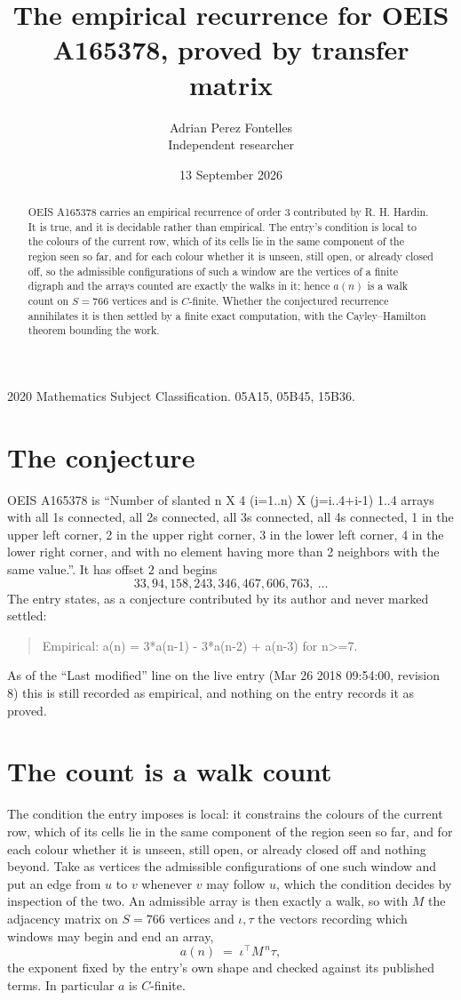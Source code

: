 \documentclass[11pt,a4paper]{article}
\title{The empirical recurrence for OEIS A165378, proved by transfer matrix}
\author{Adrian Perez Fontelles\\ \small Independent researcher}
\date{13 September 2026}
\theoremstyle{plain}
\theoremstyle{definition}
\begin{document}
\maketitle

\begin{abstract}
OEIS A165378 carries an empirical recurrence of order $3$ contributed by R. H. Hardin. It is
true, and it is decidable rather than empirical. The entry's condition is local to the colours of the current row, which of its cells lie in the same component of the region seen so far, and for each colour whether it is unseen, still open, or already closed off, so
the admissible configurations of such a window are the vertices of a finite digraph and the
arrays counted are exactly the walks in it; hence $a(n)$ is a walk count on $S=766$ vertices
and is $C$-finite. Whether the conjectured recurrence annihilates it is then settled by a
finite exact computation, with the Cayley--Hamilton theorem bounding the work.
\end{abstract}

\noindent\small 2020 Mathematics Subject Classification. 05A15, 05B45, 15B36.\normalsize

\section{The conjecture}

OEIS A165378 is ``Number of slanted n X 4 (i=1..n) X (j=i..4+i-1) 1..4 arrays with all 1s connected, all 2s connected, all 3s connected, all 4s connected, 1 in the upper left corner, 2 in the upper right corner, 3 in the lower left corner, 4 in the lower right corner, and with no element having more than 2 neighbors with the same value.''. It has offset $2$ and begins
\[
33, 94, 158, 243, 346, 467, 606, 763,\ \dots
\]
The entry states, as a conjecture contributed by its author and never marked settled:
\begin{quote}
Empirical: a(n) = 3*a(n-1) - 3*a(n-2) + a(n-3) for n>=7.
\end{quote}
As of the ``Last modified'' line on the live entry (Mar 26 2018 09:54:00, revision 8) this is still
recorded as empirical, and nothing on the entry records it as proved.

\section{The count is a walk count}

The condition the entry imposes is local: it constrains the colours of the current row, which of its cells lie in the same component of the region seen so far, and for each colour whether it is unseen, still open, or already closed off and nothing beyond. Take as
vertices the admissible configurations of one such window and put an edge from $u$ to $v$
whenever $v$ may follow $u$, which the condition decides by inspection of the two. An
admissible array is then exactly a walk, so with $M$ the adjacency matrix on $S=766$ vertices
and $\iota,\tau$ the vectors recording which windows may begin and end an array,
\[
a(n)\;=\;\iota^{\!\top}M^{\,n}\tau ,
\]
the exponent fixed by the entry's own shape and checked against its published terms. In
particular $a$ is $C$-finite.
\end{document}
